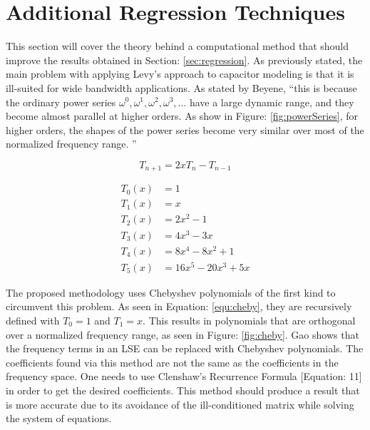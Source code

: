 \section{Additional Regression Techniques}
\label{app:adtl_regression}


This section will cover the theory behind a computational method that should improve the results obtained in Section: \ref{sec:regression}. As previously stated, the main problem with applying Levy's approach to capacitor modeling is that it is ill-suited for wide bandwidth applications. As stated by Beyene, ``this is because the ordinary power series ${\omega ^0, \omega ^1, \omega ^2, \omega ^3,...}$ have a large dynamic range, and they become almost parallel at higher orders. As show in Figure: \ref{fig:powerSeries}, for higher orders, the shapes of the power series become very similar over most of the normalized frequency range. \cite{beyene_uwave}''

\begin{equation}
\label{equ:cheby}
T_{n+1} = 2xT_{n}-T_{n-1}
\end{equation}

\begin{equation}
    \label{equ:chebyPolys}
    \begin{split}
         T_0(x) &= 1           \\
         T_1(x) &= x           \\
         T_2(x) &= 2x^2-1      \\
         T_3(x) &= 4x^3-3x     \\
         T_4(x) &= 8x^4-8x^2+1 \\
         T_5(x) &= 16x^5-20x^3+5x
    \end{split}
\end{equation}

The proposed methodology uses Chebyshev polynomials of the first kind to circumvent this problem. As seen in Equation: \eqref{equ:cheby}, they are recursively defined with $T_0 = 1$ and $T_1 = x$. This results in polynomials that are orthogonal over a normalized frequency range, as seen in Figure: \ref{fig:cheby}. Gao\cite{gao_blackBox} shows that the frequency terms in an LSE can be replaced with Chebyshev polynomials. The coefficients found via this method are not the same as the coefficients in the frequency space. One needs to use Clenshaw's Recurrence Formula \cite{gao_blackBox}[Equation: 11] in order to get the desired coefficients. This method should produce a result that is more accurate due to its avoidance of the ill-conditioned matrix while solving the system of equations.



